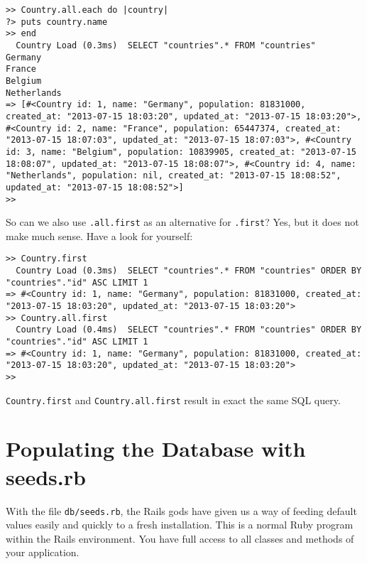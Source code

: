 \documentclass[a4paper]{book}
\newcounter{tab}[chapter]
\begin{document}
\begin{shaded}\begin{verbatim}
>> Country.all.each do |country|
?> puts country.name
>> end
  Country Load (0.3ms)  SELECT "countries".* FROM "countries"
Germany
France
Belgium
Netherlands
=> [#<Country id: 1, name: "Germany", population: 81831000, created_at: "2013-07-15 18:03:20", updated_at: "2013-07-15 18:03:20">, #<Country id: 2, name: "France", population: 65447374, created_at: "2013-07-15 18:07:03", updated_at: "2013-07-15 18:07:03">, #<Country id: 3, name: "Belgium", population: 10839905, created_at: "2013-07-15 18:08:07", updated_at: "2013-07-15 18:08:07">, #<Country id: 4, name: "Netherlands", population: nil, created_at: "2013-07-15 18:08:52", updated_at: "2013-07-15 18:08:52">]
>>
\end{verbatim}\end{shaded}

So can we also use \texttt{.all.first} as an alternative for \texttt{.first}? Yes, but it does not make much sense. Have a look for yourself:

\begin{shaded}\begin{verbatim}
>> Country.first
  Country Load (0.3ms)  SELECT "countries".* FROM "countries" ORDER BY "countries"."id" ASC LIMIT 1
=> #<Country id: 1, name: "Germany", population: 81831000, created_at: "2013-07-15 18:03:20", updated_at: "2013-07-15 18:03:20">
>> Country.all.first
  Country Load (0.4ms)  SELECT "countries".* FROM "countries" ORDER BY "countries"."id" ASC LIMIT 1
=> #<Country id: 1, name: "Germany", population: 81831000, created_at: "2013-07-15 18:03:20", updated_at: "2013-07-15 18:03:20">
>>
\end{verbatim}\end{shaded}

\texttt{Country.first} and \texttt{Country.all.first} result in exact the same SQL query.

\section{Populating the Database with seeds.rb}\label{populating-the-database-with-seeds.rb}

With the file \texttt{db/seeds.rb}, the Rails gods have given us a way of feeding default values easily and quickly to a fresh installation. This is a normal Ruby program within the Rails environment. You have full access to all classes and methods of your application.
\end{document}

